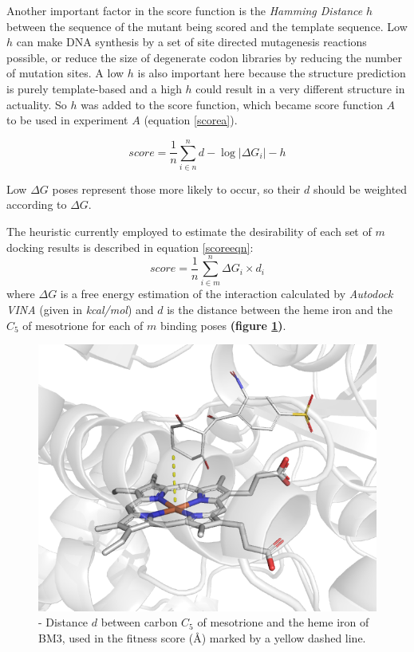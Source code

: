 \documentclass[16pt]{book}
\begin{document}
Another important factor in the score function is the \textit{Hamming Distance} $h$ between the sequence of the mutant being scored and the template sequence.
Low $h$ can make DNA synthesis by a set of site directed mutagenesis reactions possible, or reduce the size of degenerate codon libraries by reducing the number of mutation sites.
A low $h$ is also important here because the structure prediction is purely template-based and a high $h$ could result in a very different structure in actuality.
So $h$ was added to the score function, which became score function $A$ to be used in experiment $A$ (equation \ref{scorea}).

\begin{equation}
	score = \frac{1}{n} \sum^{n}_{i\in n} d - \log{|\Delta G_{i}|} - h
\end{equation}

Low $\Delta G$ poses represent those more likely to occur, so their $d$ should be weighted according to $\Delta G$.



The heuristic currently employed to estimate the desirability of each set of $m$ docking results is described in equation \ref{scoreeqn}: %
\begin{equation}\label{scoreeqn}
	score = \frac{1}{n}\sum^{n}_{i\in m} \Delta G_{i} \times d_{i}
\end{equation}
where $\Delta G$ is a free energy estimation of the interaction calculated by \textit{Autodock VINA} (given in \textit{kcal/mol}) and $d$ is the distance between the heme iron and the $C_{5}$ of mesotrione for each of $m$ binding poses \textbf{(figure \ref{score})}. 

\begin{figure}
	\includegraphics[width=\textwidth]{img/score.png}
	\caption{\label{score} - Distance $d$  between carbon $C_5$ of mesotrione and the heme iron of BM3, used in the fitness score (\AA) marked by a yellow dashed line.}
\end{figure}
\end{document}
